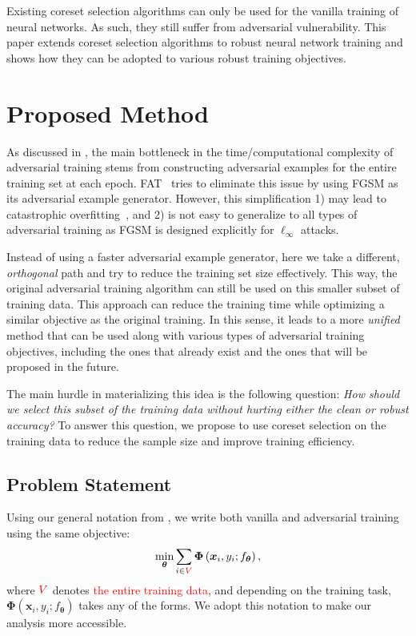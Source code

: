 \documentclass[runningheads]{llncs}
\begin{document}
Existing coreset selection algorithms can only be used for the vanilla training of neural networks.
As such, they still suffer from adversarial vulnerability.
This paper extends coreset selection algorithms to robust neural network training and shows how they can be adopted to various robust training objectives.

\section{Proposed Method}\label{sec:proposed_method}

As discussed in , the main bottleneck in the time/computational complexity of adversarial training stems from constructing adversarial examples for the entire training set at each epoch.
FAT~\cite{wong2020fast} tries to eliminate this issue by using FGSM as its adversarial example generator.
However, this simplification 1) may lead to catastrophic overfitting~\cite{wong2020fast,andriushchenko2020understanding}, and 2) is not easy to generalize to all types of adversarial training as FGSM is designed explicitly for $\ell_\infty$ attacks.

Instead of using a faster adversarial example generator, here we take a different, \textit{orthogonal} path and try to reduce the training set size effectively.
This way, the original adversarial training algorithm can still be used on this smaller subset of training data. 
This approach can reduce the training time while optimizing a similar objective as the original training.
In this sense, it leads to a more \textit{unified} method that can be used along with various types of adversarial training objectives, including the ones that already exist and the ones that will be proposed in the future. 

The main hurdle in materializing this idea is the following question: \textit{How should we select this subset of the training data without hurting either the clean or robust accuracy?}
To answer this question, we propose to use coreset selection on the training data to reduce the sample size and improve training efficiency.

\subsection{Problem Statement}\label{sec:sec:coreset_statement}

Using our general notation from , we write both vanilla and adversarial training using the same objective:
\begin{equation}\label{eq:nn_training_objective_repeat}
\min_{\boldsymbol{\theta}} \sum_{i \in \textcolor{red}{V}} \boldsymbol{\Phi} \left(\boldsymbol{x}_{i}, y_{i}; f_{\boldsymbol{\theta}}\right),
\end{equation}
where $\textcolor{red}{V}$ denotes \textcolor{red}{the entire training data}, and depending on the training task, $\boldsymbol{\Phi} \left(\boldsymbol{x}_{i}, y_{i}; f_{\boldsymbol{\theta}}\right)$ takes any of the  forms.
We adopt this notation to make our analysis more accessible.
\end{document}
